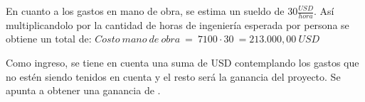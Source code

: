 En cuanto a los gastos en mano de obra, se estima un sueldo de $30\frac{USD}{hora}$. Así multiplicandolo por la cantidad de horas de ingeniería esperada por persona se obtiene un total de: $Costo \ mano \ de \ obra \ = \ 7100 \cdot 30 \ = 213.000,00 \ USD$




Como ingreso, se tiene en cuenta una suma de \TBD USD contemplando los gastos que no estén siendo tenidos en cuenta y el resto será la ganancia del proyecto. Se apunta a obtener una ganancia de \TBD.
%
%
